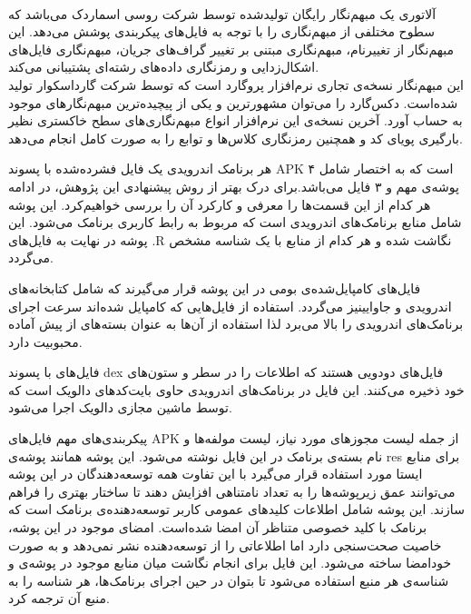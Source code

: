 \\
آلاتوری یک مبهم‌نگار رایگان تولید‌شده توسط شرکت روسی اسماردک می‌باشد که سطوح مختلفی از مبهم‌نگاری را با توجه به فایل‌های پیکر‌بندی پوشش می‌دهد. این مبهم‌نگار از تغییرنام، مبهم‌نگاری مبتنی بر تغییر گراف‌های جریان، مبهم‌نگاری فایل‌های اشکال‌زدایی و رمز‌نگاری داده‌های رشته‌ای پشتیبانی می‌کند.
\\
این مبهم‌نگار نسخه‌ی تجاری نرم‌افزار پروگارد است که توسط شرکت گارداسکوار تولید شده‌است. دکس‌گارد را می‌توان مشهورترین و یکی از پیچیده‌ترین مبهم‌نگار‌های موجود به حساب آورد. آخرین نسخه‌ی این نرم‌افزار انواع مبهم‌نگاری‌های سطح خاکستری نظیر بارگیری پویای کد و همچنین رمزنگاری کلاس‌ها و توابع را به صورت کامل انجام می‌دهد.


هر برنامک اندرویدی یک فایل فشرده‌شده با پسوند APK است که به اختصار شامل ۴ پوشه‌ی مهم و ۳ فایل می‌باشد.برای درک بهتر از روش پیشنهادی این پژوهش، در ادامه هر کدام از این قسمت‌ها را معرفی و کارکرد آن‌ را بررسی خواهیم‌کرد.
 این پوشه شامل منابع برنامک‌های اندرویدی است که مربوط به رابط کاربری برنامک می‌شود. این پوشه در نهایت به فایل‌های {.R} نگاشت شده و هر کدام از منابع با یک شناسه مشخص می‌گردد.

  فایل‌های کامپایل‌شده‌ی بومی در این پوشه قرار می‌گیرند که شامل کتابخانه‌های اندرویدی و جاوایینیز می‌گردد. استفاده از فایل‌هایی که کامپایل شده‌اند سرعت اجرای برنامک‌های اندرویدی را بالا می‌برد لذا استفاده از آن‌ها به عنوان بسته‌‌های از پیش آماده محبوبیت دارد.

  فایل‌های با پسوند {dex} فایل‌های دودویی هستند که اطلاعات را در سطر و ستون‌های خود ذخیره می‌کنند. این فایل  در برنامک‌های اندرویدی حاوی بایت‌کد‌های دالویک است که توسط ماشین مجازی دالویک اجرا می‌شود.

  پیکر‌بندی‌های مهم فایل‌های APK از جمله لیست مجوز‌های مورد نیاز، لیست مولفه‌ها و نام بسته‌ی برنامک در این فایل نوشته می‌شود.
  این پوشه همانند پوشه‌ی res برای منابع ایستا مورد استفاده قرار می‌گیرد با این تفاوت همه توسعه‌دهندگان در این پوشه می‌توانند عمق زیر‌پوشه‌ها را به تعداد نامتناهی افزایش دهند تا ساختار بهتری را فراهم سازند.
  این پوشه شامل اطلاعات کلید‌‌های عمومی کاربر توسعه‌دهنده‌ی برنامک است که برنامک با کلید خصوصی متناظر آن امضا شده‌است. امضا‌ی موجود در این پوشه، خاصیت صحت‌سنجی دارد اما اطلاعاتی را از توسعه‌دهنده نشر نمی‌دهد و به صورت خود‌امضا ساخته‌ می‌شود.
  این فایل برای انجام نگاشت میان منابع موجود در پوشه‌ی  و شناسه‌ی هر منبع استفاده می‌شود تا بتوان در حین اجرای برنامک‌ها، هر شناسه‌ را به منبع آن ترجمه کرد.

